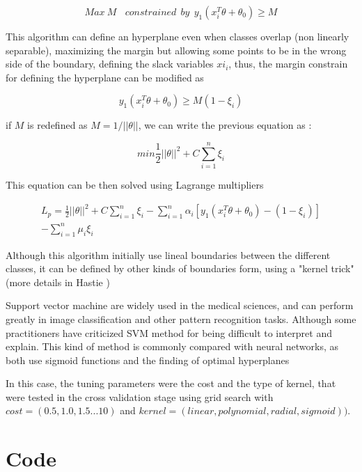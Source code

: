 \documentclass[10pt,twocolumn,letterpaper]{article}
\begin{document}
\begin{equation}
Max \: M \:\:\:\: constrained \:\:by  \:\: y_1(x_i^T \theta + \theta_0) \geq M
\end{equation}

This algorithm can define an hyperplane even when classes overlap (non linearly separable), maximizing the margin but allowing some points to be in the wrong side of the boundary, defining the slack variables $xi_i$, thus, the margin constrain for defining the hyperplane can be modified as \cite{Hastie2009}

\begin{equation}
y_1(x_i^T \theta + \theta_0) \geq M(1-\xi_i) 
\end{equation}

if $M$ is redefined as $M = 1/||\theta||$, we can write the previous equation as \cite{Hastie2009}:

\begin{equation}
min \frac{1}{2}||\theta||^2 + C \sum^n_{i=1}\xi_i
\end{equation}

This equation can be then solved using Lagrange multipliers \cite{Hastie2009}

\begin{multline}
L_p = \frac{1}{2}||\theta||^2 + C \sum^n_{i=1}\xi_i - \sum^n_{i=1}\alpha_i[y_1(x_i^T \theta + \theta_0) - (1-\xi_i)] \\ - \sum^n_{i=1}\mu_i\xi_i
\end{multline}

Although this algorithm initially use lineal boundaries between the different classes, it can be defined by other kinds of boundaries form, using a "kernel trick" (more details in Hastie \cite{Hastie2009})

Support vector machine are widely used in the medical sciences, and can perform greatly in image classification and other pattern recognition tasks. Although some practitioners have criticized SVM method for being difficult to interpret and explain. This kind of method is commonly compared with neural networks, as both use sigmoid functions and the finding of optimal hyperplanes \cite{Bell2014}

In this case, the tuning parameters were the cost and the type of kernel, that were tested in the cross validation stage using grid search with $cost = (0.5,1.0,1.5...10)$ and $kernel = (linear, polynomial, radial, sigmoid))$. 

\section{Code}
\end{document}
